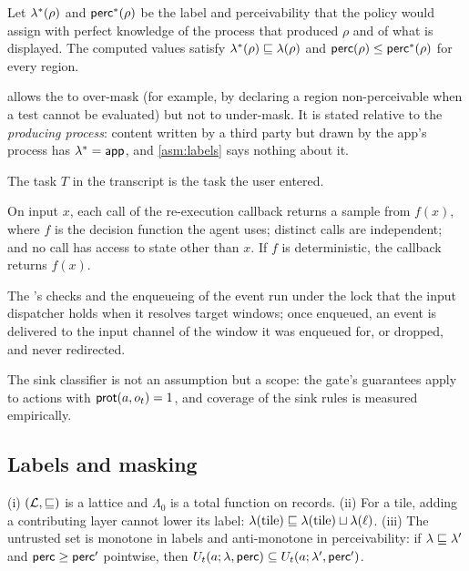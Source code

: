 \begin{assumption}\label{asm:labels}
Let $\lambda^*(\rho)$ and $\mathsf{perc}^*(\rho)$ be the label and perceivability that the policy would assign with perfect knowledge of the process that produced $\rho$ and of what is displayed. The computed values satisfy $\lambda^*(\rho)\sqsubseteq\lambda(\rho)$ and $\mathsf{perc}(\rho)\le\mathsf{perc}^*(\rho)$ for every region.
\end{assumption}

 allows the \LS{} to over-mask (for example, by declaring a region non-perceivable when a test cannot be evaluated) but not to under-mask. It is stated relative to the \emph{producing process}: content written by a third party but drawn by the app's process has $\lambda^*=\textsf{app}$, and \cref{asm:labels} says nothing about it.

\begin{assumption}\label{asm:task}
The task $T$ in the transcript is the task the user entered.
\end{assumption}

\begin{assumption}\label{asm:fidelity}
On input $x$, each call of the re-execution callback returns a sample from $f(x)$, where $f$ is the decision function the agent uses; distinct calls are independent; and no call has access to state other than $x$. If $f$ is deterministic, the callback returns $f(x)$.
\end{assumption}

\begin{assumption}\label{asm:atomic}
The \DB{}'s checks and the enqueueing of the event run under the lock that the input dispatcher holds when it resolves target windows; once enqueued, an event is delivered to the input channel of the window it was enqueued for, or dropped, and never redirected.
\end{assumption}

The sink classifier is not an assumption but a scope: the gate's guarantees apply to actions with $\mathsf{prot}(a,o_t)=1$, and coverage of the sink rules is measured empirically.

\subsection{Labels and masking}

\begin{lemma}\label{lem:lattice}
(i) $(\mathcal{L},\sqsubseteq)$ is a lattice and $\Lambda_0$ is a total function on records. (ii) For a tile, adding a contributing layer cannot lower its label: $\lambda(\text{tile})\sqsubseteq\lambda(\text{tile})\sqcup\lambda(\ell)$. (iii) The untrusted set is monotone in labels and anti-monotone in perceivability: if $\lambda\sqsubseteq\lambda'$ and $\mathsf{perc}\ge\mathsf{perc}'$ pointwise, then $U_t(a;\lambda,\mathsf{perc})\subseteq U_t(a;\lambda',\mathsf{perc}')$.
\end{lemma}

